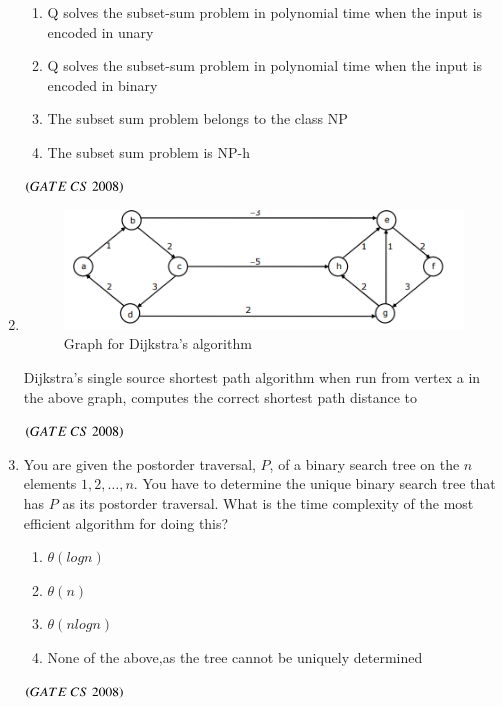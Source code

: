 \documentclass[journal]{IEEEtran}
\numberwithin{equation}{enumi}
\numberwithin{figure}{enumi}
\begin{document}
\begin{enumerate}
\begin{enumerate}
   \item Q solves the subset-sum problem in polynomial time when the input is
encoded in unary
   \item  Q solves the subset-sum problem in polynomial time when the input is encoded in binary
   \item The subset sum problem belongs to the class NP
   \item The subset sum problem is NP-h
\end{enumerate}
\hfill $\left(GATE\ CS\  2008\right)$
 

\item
\begin{figure}[H]
  \centering
  \includegraphics[width=0.5\columnwidth]{figs/fig4.png}
  \caption{Graph for Dijkstra's algorithm}
  \label{fig:4}
\end{figure}

 Dijkstra's single source shortest path algorithm when run from vertex a in the above graph, computes the correct shortest path distance to 

\begin{enumerate} 
\end{enumerate}
\hfill $\left(GATE\ CS\  2008\right)$

\item You are given the postorder traversal, $P$, of a binary search tree on the $n$ elements $1, 2,\dots,n$. You have to determine the unique binary search tree that has $P$ as its postorder traversal. What is the time complexity of the most efficient algorithm for doing this? 
\begin{enumerate}
   \item $\theta(logn)$
   \item $\theta(n)$
   \item $\theta(nlogn)$
   \item None of the above,as the tree cannot be uniquely determined 
 \end{enumerate}
 \hfill $\left(GATE\ CS\  2008\right)$
  


\end{enumerate}
\end{document}
